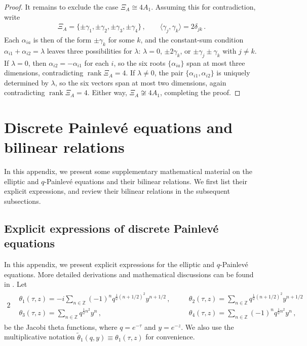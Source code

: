 \documentclass[11pt, a4paper]{article}
\DeclareMathOperator{\rank}{rank}
\theoremstyle{definition}
\begin{document}
\begin{proof}
    It remains to exclude the case $ \Xi_A \cong 4A_1 $. Assuming this for
    contradiction, write
    \begin{align}
        \Xi_A = \{ \pm \gamma_1, \pm \gamma_2, \pm \gamma_3, \pm \gamma_4 \} \, ,
        \qquad \langle \gamma_j, \gamma_k \rangle = 2\delta_{jk} \, .
    \end{align}
    Each $ \alpha_{ia} $ is then of the form $ \pm \gamma_k $ for some $ k $, and the constant-sum condition $ \alpha_{i1}+\alpha_{i2}=\lambda $ leaves three possibilities for $ \lambda $: $ \lambda = 0 $, $ \pm 2\gamma_k $, or $ \pm\gamma_j \pm \gamma_k $ with $ j\neq k $. If $ \lambda = 0 $, then $ \alpha_{i2} = -\alpha_{i1} $ for each $ i $, so the six roots $ \{\alpha_{ia}\} $ span at most three dimensions, contradicting $ \rank\Xi_A = 4 $. If $ \lambda \neq 0 $, the pair $ \{\alpha_{i1}, \alpha_{i2}\} $ is uniquely determined by $ \lambda $, so the six vectors span at most two dimensions, again contradicting $ \rank\Xi_A = 4 $. Either way, $ \Xi_A \not\cong 4A_1 $, completing the proof.
\end{proof}






\section{Discrete Painlev\'e equations and bilinear relations} \label{app:bilinear}

In this appendix, we present some supplementary mathematical material on the elliptic and $ q $-Painlev\'e equations and their bilinear relations. We first list their explicit expressions, and review their bilinear relations in the subsequent subsections.


\subsection{Explicit expressions of discrete Painlev\'e equations} \label{app:PainleveExpression}

In this appendix, we present explicit expressions for the elliptic and $ q $-Painlev\'e equations. More detailed derivations and mathematical discussions can be found in \cite{Sakai:2007, Yamada:2014, Kajiwara:2015}. Let
\begin{alignat}{2}
    \begin{aligned}\label{eq:theta}
        &\theta_1(\tau,z) = -i \sum_{n\in \mathbb{Z}} (-1)^n q^{\frac{1}{2}(n+1/2)^2} y^{n+1/2} \, , \quad
        &&\theta_2(\tau,z) = \sum_{n\in \mathbb{Z}} q^{\frac{1}{2}(n+1/2)^2} y^{n+1/2} \\
        &\theta_3(\tau,z) = \sum_{n\in \mathbb{Z}} q^{\frac{1}{2}n^2} y^{n} \, , \quad
        &&\theta_4(\tau,z) = \sum_{n\in \mathbb{Z}} (-1)^n q^{\frac{1}{2}n^2} y^{n} \, ,
    \end{aligned}
\end{alignat}
be the Jacobi theta functions, where $ q=e^{-\tau} $ and $ y=e^{-z} $. We also use the multiplicative notation $ \tilde{\theta}_1(q,y) \equiv \theta_1(\tau,z) $ for convenience.
\end{document}
